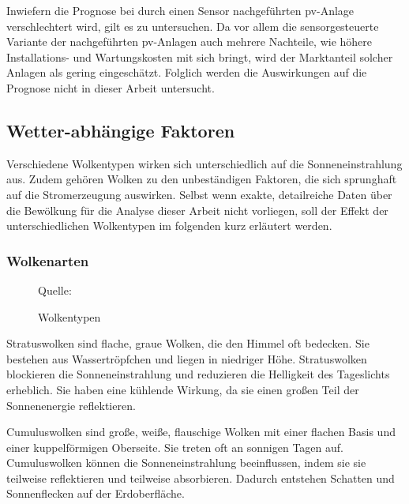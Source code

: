 \documentclass[12pt, a4paper]{article}
\begin{document}
Inwiefern die Prognose bei durch einen Sensor nachgeführten \ac{pv}-Anlage verschlechtert wird, gilt es zu untersuchen. Da vor allem die sensorgesteuerte Variante der nachgeführten \ac{pv}-Anlagen auch mehrere Nachteile, wie höhere Installations- und Wartungskosten mit sich bringt, wird der Marktanteil solcher Anlagen als gering eingeschätzt. Folglich werden die Auswirkungen auf die Prognose nicht in dieser Arbeit untersucht.

\subsection{Wetter-abhängige Faktoren}

Verschiedene Wolkentypen wirken sich unterschiedlich auf die Sonneneinstrahlung aus. Zudem gehören Wolken zu den unbeständigen Faktoren, die sich sprunghaft auf die Stromerzeugung auswirken. Selbst wenn exakte, detailreiche Daten über die Bewölkung für die Analyse dieser Arbeit nicht vorliegen, soll der Effekt der unterschiedlichen Wolkentypen im folgenden kurz erläutert werden.

\subsubsection{Wolkenarten}
\label{subsubsec:clouds}

\begin{figure}
\centering
\def\svgwidth{425pt}

\captionsetup{justification=raggedleft,singlelinecheck=false,skip=0pt}\caption*{\scriptsize{Quelle: \cite{pic:wikipedia}}}
\captionsetup{justification=centering,singlelinecheck=false,skip=25pt}
\caption{Wolkentypen}
\label{wolkentypen}
\end{figure}


Stratuswolken sind flache, graue Wolken, die den Himmel oft bedecken. Sie bestehen aus Wassertröpfchen und liegen in niedriger Höhe. Stratuswolken blockieren die Sonneneinstrahlung und reduzieren die Helligkeit des Tageslichts erheblich. Sie haben eine kühlende Wirkung, da sie einen großen Teil der Sonnenenergie reflektieren.

Cumuluswolken sind große, weiße, flauschige Wolken mit einer flachen Basis und einer kuppelförmigen Oberseite. Sie treten oft an sonnigen Tagen auf. Cumuluswolken können die Sonneneinstrahlung beeinflussen, indem sie sie teilweise reflektieren und teilweise absorbieren. Dadurch entstehen Schatten und Sonnenflecken auf der Erdoberfläche.
\end{document}
